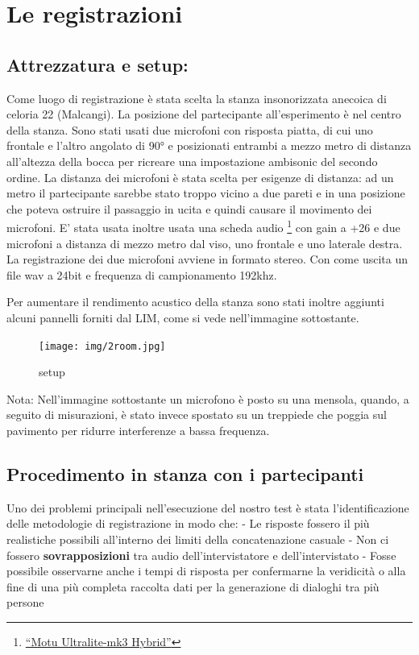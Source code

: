 \documentclass[
]{article}
\begin{document}
\section{Le registrazioni}\label{le-registrazioni}

\subsection{Attrezzatura e setup:}\label{attrezzatura-e-setup}

Come luogo di registrazione è stata scelta la stanza insonorizzata anecoica di celoria 22 (Malcangi). La posizione del partecipante all'esperimento è nel centro della stanza. Sono stati usati due microfoni con risposta piatta, di cui uno frontale e l'altro angolato di 90° e posizionati entrambi a mezzo metro di distanza all'altezza della bocca per ricreare una impostazione ambisonic del secondo ordine. La distanza dei microfoni è stata scelta per esigenze di distanza: ad un metro il partecipante sarebbe stato troppo vicino a due pareti e in una posizione che poteva ostruire il passaggio in ucita e quindi causare il movimento dei microfoni. E' stata usata inoltre usata una scheda audio \footnote{\href{https://motu.com/products/motuaudio/ultralite-mk3/i-o.html}{``Motu Ultralite-mk3 Hybrid''}} con gain a +26 e due microfoni a distanza di mezzo metro dal viso, uno frontale e uno laterale destra. La registrazione dei due microfoni avviene in formato stereo. Con come uscita un file wav a 24bit e frequenza di campionamento 192khz.

Per aumentare il rendimento acustico della stanza sono stati inoltre aggiunti alcuni pannelli forniti dal LIM, come si vede nell'immagine sottostante.

\begin{figure}
\centering
\texttt{[image: img/2room.jpg]}
\caption{setup}
\end{figure}

Nota: Nell'immagine sottostante un microfono è posto su una mensola, quando, a seguito di misurazioni, è stato invece spostato su un treppiede che poggia sul pavimento per ridurre interferenze a bassa frequenza.

\subsection{Procedimento in stanza con i partecipanti}\label{procedimento-in-stanza-con-i-partecipanti}

Uno dei problemi principali nell'esecuzione del nostro test è stata l'identificazione delle metodologie di registrazione in modo che: - Le risposte fossero il più realistiche possibili all'interno dei limiti della concatenazione casuale - Non ci fossero \textbf{sovrapposizioni} tra audio dell'intervistatore e dell'intervistato - Fosse possibile osservarne anche i tempi di risposta per confermarne la veridicità o alla fine di una più completa raccolta dati per la generazione di dialoghi tra più persone
\end{document}
